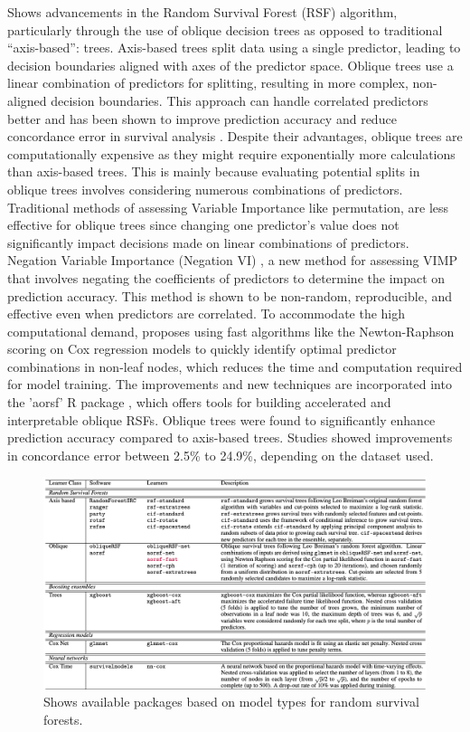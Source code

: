 \par \noindent \parencite{jaeger_accelerated_2022} Shows advancements in the Random Survival Forest (RSF) algorithm, particularly through the use of oblique decision trees as opposed to traditional “axis-based”: trees. \parencite{jaeger_accelerated_2022} Axis-based trees split data using a single predictor, leading to decision boundaries aligned with axes of the predictor space. Oblique trees use a linear combination of predictors for splitting, resulting in more complex, non-aligned decision boundaries. This approach can handle correlated predictors better and has been shown to improve prediction accuracy and reduce concordance error in survival analysis \parencite{jaeger_accelerated_2022}. Despite their advantages, oblique trees are computationally expensive as they might require exponentially more calculations than axis-based trees. This is mainly because evaluating potential splits in oblique trees involves considering numerous combinations of predictors. Traditional methods of assessing Variable Importance \parencite{pham_springer_2023} like permutation, are less effective for oblique trees since changing one predictor's value does not significantly impact decisions made on linear combinations of predictors. Negation Variable Importance (Negation VI) \parencite{jaeger_accelerated_2022}, a new method for assessing VIMP that involves negating the coefficients of predictors to determine the impact on prediction accuracy. This method is shown to be non-random, reproducible, and effective even when predictors are correlated. To accommodate the high computational demand, \parencite{jaeger_accelerated_2022} proposes using fast algorithms like the Newton-Raphson scoring on Cox regression models to quickly identify optimal predictor combinations in non-leaf nodes, which reduces the time and computation required for model training. The improvements and new techniques are incorporated into the 'aorsf' R package \parencite{jaeger_accelerated_2022}, which offers tools for building accelerated and interpretable oblique RSFs. Oblique trees were found to significantly enhance prediction accuracy compared to axis-based trees. Studies showed improvements in concordance error between 2.5\% to 24.9\%, depending on the dataset used.

\begin{figure}
    \includegraphics[scale=0.42]{Figures/OBLIQUE_SUMMARY.png}
    \caption{\parencite{jaeger_accelerated_2022} Shows available packages based on model types for random survival forests.}
\end{figure}

